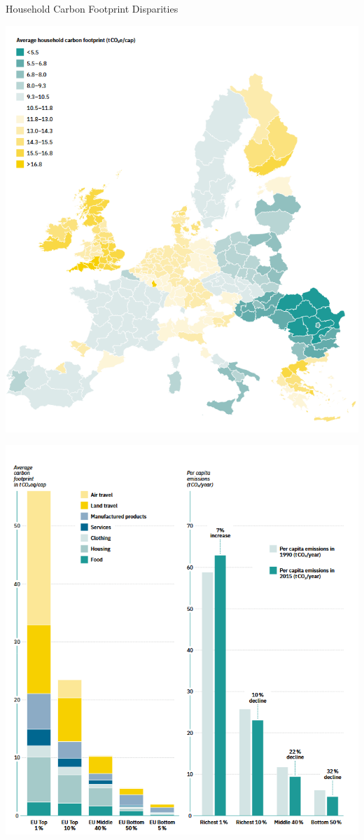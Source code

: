 \documentclass{beamer}
\begin{document}
\begin{frame}{Household Carbon Footprint Disparities}
  \vspace{-2.0em}
\centering
\begin{minipage}{0.45\linewidth}
    \includegraphics[width=\linewidth]{per capita world emissions.png}
\end{minipage}
\hfill
\begin{minipage}{0.45\linewidth}
    \includegraphics[width=\linewidth]{emission by income.png}
\end{minipage}


\end{frame}
\end{document}
